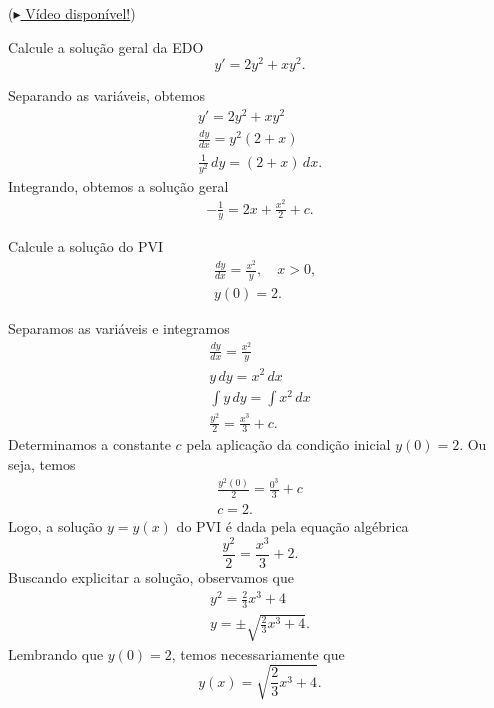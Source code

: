 \begin{exeresol} (\href{https://archive.org/details/er-edo-eq-separavel}{$\blacktriangleright$ Vídeo disponível!})
  
  Calcule a solução geral da EDO
  \begin{equation}
    y' = 2y^2 + xy^2.
  \end{equation}
\end{exeresol}
\begin{resol}
  Separando as variáveis, obtemos
  \begin{gather}
    y' = 2y^2 + xy^2 \\
    \frac{dy}{dx} = y^2(2 + x) \\
    \frac{1}{y^2}\,dy = (2+x)\,dx.
  \end{gather}
  Integrando, obtemos a solução geral
  \begin{align}
    -\frac{1}{y} = 2x + \frac{x^2}{2} + c.
  \end{align}
\end{resol}

\begin{exeresol}
  Calcule a solução do PVI
  \begin{align}
    &\frac{dy}{dx} = \frac{x^2}{y},\quad x>0,\\
    &y(0) = 2.
  \end{align}
\end{exeresol}
\begin{resol}
  Separamos as variáveis e integramos
  \begin{gather}
    \frac{dy}{dx} = \frac{x^2}{y} \\
    y\,dy = x^2\,dx \\
    \int y\,dy = \int x^2\,dx \\
    \frac{y^2}{2} = \frac{x^3}{3} + c.
  \end{gather}
  Determinamos a constante $c$ pela aplicação da condição inicial $y(0) = 2$. Ou seja, temos
  \begin{gather}
    \frac{y^2(0)}{2} = \frac{0^3}{3} + c \\
    c = 2.
  \end{gather}
  Logo, a solução $y = y(x)$ do PVI é dada pela equação algébrica
  \begin{equation}
    \frac{y^2}{2} = \frac{x^3}{3} + 2.
  \end{equation}
  Buscando explicitar a solução, observamos que
  \begin{gather}
    y^2 = \frac{2}{3}x^3 + 4 \\
    y = \pm\sqrt{\frac{2}{3}x^3+4}.
  \end{gather}
  Lembrando que $y(0) = 2$, temos necessariamente que
  \begin{equation}
    y(x) = \sqrt{\frac{2}{3}x^3 + 4}.
  \end{equation}
\end{resol}

